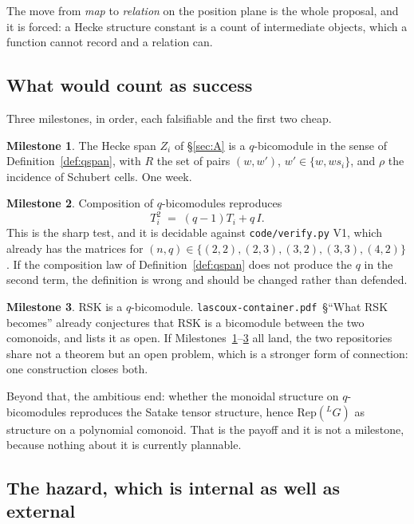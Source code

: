 \documentclass[11pt,a4paper]{article}
\theoremstyle{definition}
\newtheorem{milestone}{Milestone}
\theoremstyle{remark}
\newcommand{\Rep}{\mathrm{Rep}}
\newcommand{\dual}[1]{{}^{L}\!#1}
\begin{document}
The move from \emph{map} to \emph{relation} on the position plane is the whole
proposal, and it is forced: a Hecke structure constant is a count of
intermediate objects, which a function cannot record and a relation can.

\subsection{What would count as success}

Three milestones, in order, each falsifiable and the first two cheap.

\begin{milestone}\label{m:A1}
The Hecke span $Z_i$ of \S\ref{sec:A} is a $q$-bicomodule in the sense of
Definition~\ref{def:qspan}, with $R$ the set of pairs $(w, w')$, $w' \in \{w,
ws_i\}$, and $\rho$ the incidence of Schubert cells. One week.
\end{milestone}

\begin{milestone}\label{m:A2}
Composition of $q$-bicomodules reproduces
\[
  T_i^2 \;=\; (q-1)T_i + q\,I .
\]
This is the sharp test, and it is decidable against
\texttt{code/verify.py} V1, which already has the matrices for
$(n,q) \in \{(2,2),(2,3),(3,2),(3,3),(4,2)\}$. If the composition law of
Definition~\ref{def:qspan} does not produce the $q$ in the second term, the
definition is wrong and should be changed rather than defended.
\end{milestone}

\begin{milestone}\label{m:A3}
RSK is a $q$-bicomodule. \texttt{lascoux-container.pdf}~\S``What RSK becomes''
already conjectures that RSK is a bicomodule between the two comonoids, and
lists it as open. If Milestones~\ref{m:A1}--\ref{m:A3} all land, the two
repositories share not a theorem but an open problem, which is a stronger form
of connection: one construction closes both.
\end{milestone}

Beyond that, the ambitious end: whether the monoidal structure on
$q$-bicomodules reproduces the Satake tensor structure, hence
$\Rep(\dual{G})$ as structure on a polynomial comonoid. That is the payoff and
it is not a milestone, because nothing about it is currently plannable.

\subsection{The hazard, which is internal as well as external}
\end{document}

